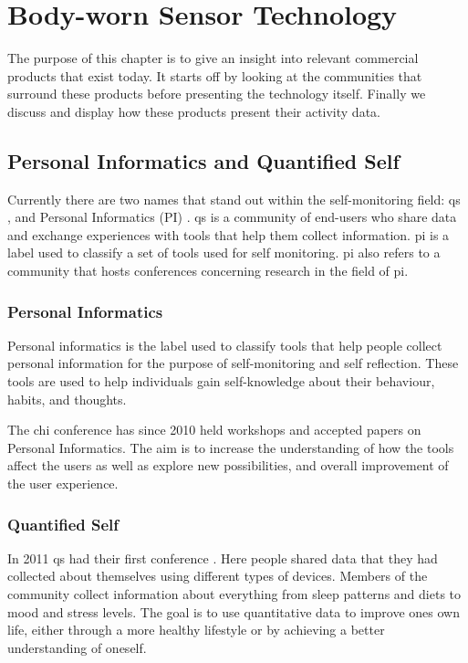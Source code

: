 \chapter{Body-worn Sensor Technology}
The purpose of this chapter is to give an insight into relevant commercial products that exist today. It starts off by looking at the communities that surround these products before presenting the technology itself. Finally we discuss and display how these products present their activity data.

\section{Personal Informatics and Quantified Self}
Currently there are two names that stand out within the self-monitoring field: \gls{qs} \cite{quantifiedSelf}, and Personal Informatics (PI) \cite{personalInformatics}. \gls{qs} is a community of end-users who share data and exchange experiences with tools that help them collect information. \gls{pi} is a label used to classify a set of tools used for self monitoring. \gls{pi} also refers to a community that hosts conferences concerning research in the field of \gls{pi}.

\subsection{Personal Informatics}
Personal informatics is the label used to classify tools that help people collect personal information for the purpose of self-monitoring and self reflection. These tools are used to help individuals gain self-knowledge about their behaviour, habits, and thoughts.

The \gls{chi} conference has since 2010 \cite{chi2010} held workshops and accepted papers on Personal Informatics. The aim is to increase the understanding of how the tools affect the users as well as explore new possibilities, and overall improvement of the user experience.

\subsection{Quantified Self}
In 2011 \gls{qs} had their first conference \cite{bodyHackers}. Here people shared data that they had collected about themselves using different types of devices. Members of the community collect information about everything from sleep patterns and diets to mood and stress levels. The goal is to use quantitative data to improve ones own life, either through a more healthy lifestyle or by achieving a better understanding of oneself. 

